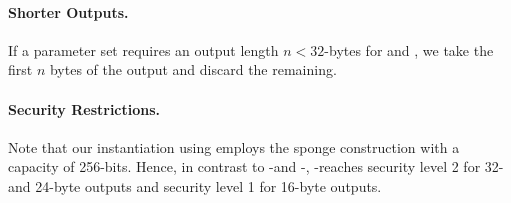    \paragraph{Shorter Outputs.} If a parameter set requires an 
   output length $n < 32$-bytes for \sphincsF and \sphincsPRF,
   we take the first $n$ bytes of the output and discard the remaining.

   \paragraph{Security Restrictions.} Note that our instantiation using \haraka 
   employs the sponge construction with a capacity of 256-bits. Hence, in 
   contrast to \spx-\shatwo and \spx-\shathree, \spx-\haraka reaches 
   security level 2 for 32- and 24-byte outputs and security level 1 for 
   16-byte outputs.
   
   

